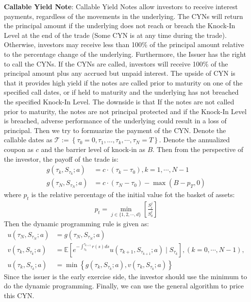 \documentclass[11pt,a4paper]{article}
\theoremstyle{remark}
\begin{document}
\noindent \textbf{Callable Yield Note}: Callable Yield Notes allow investors to receive interest payments, regardless of the movements in the underlying. The CYNs will return the principal amount if the underlying does not reach or breach the Knock-In Level at the end of the trade (Some CYN is at any time during the trade). Otherwise, investors may receive less than 100\% of the principal amount relative to the percentage change of the underlying. Furthermore, the Issuer has the right to call the CYNs. If the CYNs are called, investors will receive 100\% of the principal amount plus any accrued but unpaid interest.
The upside of CYN is that it provides high yield if the notes are called prior to maturity on one of the specified call dates, or if held to maturity and the underlying has not breached the specified Knock-In Level. The downside is that If the notes are not called prior to maturity, the notes are not principal protected and if the Knock-In Level is breached, adverse performance of the underlying could result in a loss of principal. Then we try to formuarize the payment of the CYN. Denote the callable dates as $\mathcal{T}:=\left\{\tau_0=0, \tau_1, \ldots, \tau_k,\cdots,\tau_N=T\right\}$.  Denote the annualized coupon as $c$ and the barrier level of knock-in as $B$. Then from the perspective of the investor, the payoff of the trade is:
\begin{align}
	g(\tau_k, S_{\tau_k}; a) &= c \cdot (\tau_k - \tau_0), k=1,\cdots,N-1 \\
	g(\tau_N, S_{\tau_N}; a) &= c \cdot (\tau_N - \tau_0) - \max(B - p_T, 0)
\end{align}
where $p_t$ is the relative percentage of the initial value fot the basket of assets:
\begin{align*}
	p_t=\min _{j \in\{1,2, \cdots, d\}}\left[\frac{S^j_t}{S^j_0}\right]
\end{align*}
Then the dynamic programming rule is given as:
\begin{align}
	u(\tau_N, S_{\tau_N}; a) &= g(\tau_N, S_{\tau_N}; a)\\
	v(\tau_k, S_{\tau_k}; a) &= \mathbb{E}\left[e^{-\int_{\tau_k}^{\tau_{k+1}} r(s) ds}u\left(\tau_{k+1}, S_{\tau_{k+1}}; a\right) \mid S_{\tau_{k}} \right] , (k = 0,\cdots, N-1),\\
	u(\tau_k, S_{\tau_k}; a) &= \min \left\{g(\tau_k, S_{\tau_k}; a),  v(\tau_k, S_{\tau_k}; a)\right\}
\end{align}
Since the issuer is the early exercise side, the investor should use the minimum to do the dynamic programming. Finally, we can use the general algorithm to price this CYN.
\end{document}
